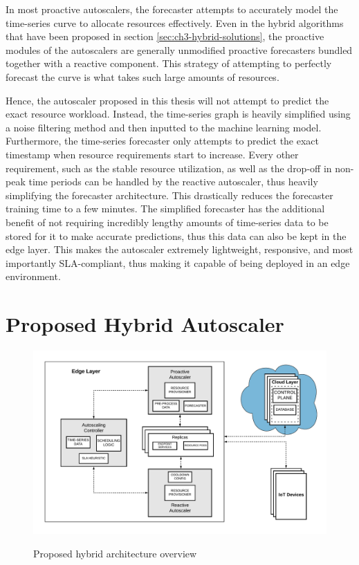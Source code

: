 In most proactive autoscalers, the forecaster attempts to accurately model the time-series curve to allocate resources effectively. Even in the hybrid algorithms that have been proposed in section \ref{sec:ch3-hybrid-solutions}, the proactive modules of the autoscalers are generally unmodified proactive forecasters bundled together with a reactive component. This strategy of attempting to perfectly forecast the curve is what takes such large amounts of resources.\par

Hence, the autoscaler proposed in this thesis will not attempt to predict the exact resource workload. Instead, the time-series graph is heavily simplified using a noise filtering method and then inputted to the machine learning model. Furthermore, the time-series forecaster only attempts to predict the exact timestamp when resource requirements start to increase. Every other requirement, such as the stable resource utilization, as well as the drop-off in non-peak time periods can be handled by the reactive autoscaler, thus heavily simplifying the forecaster architecture. This drastically reduces the forecaster training time to a few minutes. The simplified forecaster has the additional benefit of not requiring incredibly lengthy amounts of time-series data to be stored for it to make accurate predictions, thus this data can also be kept in the edge layer. This makes the autoscaler extremely lightweight, responsive, and most importantly SLA-compliant, thus making it capable of being deployed in an edge environment.\par

\section{Proposed Hybrid Autoscaler}
\label{sec:ch4-hybrid-autoscale-overview} 

\begin{figure}[htb]
    \centering
    \caption{Proposed hybrid architecture overview}
    \includegraphics[width=1.0\linewidth]{Figures/Hybrid-Architecture-Overview.pdf}
    \label{fig:hybrid-arch-overview}
\end{figure}

